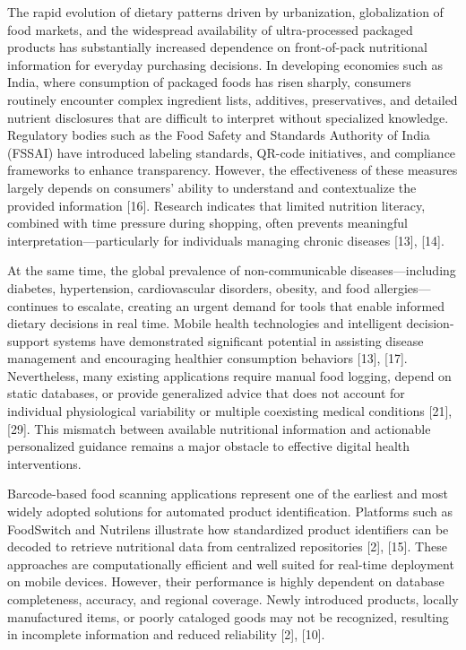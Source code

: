 \documentclass[conference]{IEEEtran}
\begin{document}
The rapid evolution of dietary patterns driven by urbanization, globalization of food markets, and the widespread availability of ultra-processed packaged products has substantially increased dependence on front-of-pack nutritional information for everyday purchasing decisions. In developing economies such as India, where consumption of packaged foods has risen sharply, consumers routinely encounter complex ingredient lists, additives, preservatives, and detailed nutrient disclosures that are difficult to interpret without specialized knowledge. Regulatory bodies such as the Food Safety and Standards Authority of India (FSSAI) have introduced labeling standards, QR-code initiatives, and compliance frameworks to enhance transparency. However, the effectiveness of these measures largely depends on consumers’ ability to understand and contextualize the provided information [16]. Research indicates that limited nutrition literacy, combined with time pressure during shopping, often prevents meaningful interpretation—particularly for individuals managing chronic diseases [13], [14].

At the same time, the global prevalence of non-communicable diseases—including diabetes, hypertension, cardiovascular disorders, obesity, and food allergies—continues to escalate, creating an urgent demand for tools that enable informed dietary decisions in real time. Mobile health technologies and intelligent decision-support systems have demonstrated significant potential in assisting disease management and encouraging healthier consumption behaviors [13], [17]. Nevertheless, many existing applications require manual food logging, depend on static databases, or provide generalized advice that does not account for individual physiological variability or multiple coexisting medical conditions [21], [29]. This mismatch between available nutritional information and actionable personalized guidance remains a major obstacle to effective digital health interventions.

Barcode-based food scanning applications represent one of the earliest and most widely adopted solutions for automated product identification. Platforms such as FoodSwitch and Nutrilens illustrate how standardized product identifiers can be decoded to retrieve nutritional data from centralized repositories [2], [15]. These approaches are computationally efficient and well suited for real-time deployment on mobile devices. However, their performance is highly dependent on database completeness, accuracy, and regional coverage. Newly introduced products, locally manufactured items, or poorly cataloged goods may not be recognized, resulting in incomplete information and reduced reliability [2], [10].
\end{document}
